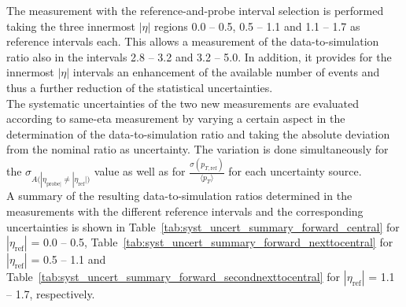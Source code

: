 The measurement with the reference-and-probe interval selection is performed taking the three innermost $|\eta|$ regions 0.0 -- 0.5, 0.5 -- 1.1 and 1.1 -- 1.7 as reference intervals each. This allows a measurement of the data-to-simulation ratio also in the intervals 2.8 -- 3.2 and 3.2 -- 5.0. In addition, it provides for the innermost $|\eta|$ intervals an enhancement of the available number of events and thus a further reduction of the statistical uncertainties.\\
The systematic uncertainties of the two new measurements are evaluated according to same-eta measurement by varying a certain aspect in the determination of the data-to-simulation ratio and taking the absolute deviation from the nominal ratio as uncertainty. The variation is done simultaneously for the $\sigma_{A({|\eta_{\mathrm{probe}|} \neq |\eta_{\mathrm{ref}}|)}}$ value as well as for $\frac{\sigma (p_{T, \mathrm{ref}})}{{\langle p_{T} \rangle}}$ for each uncertainty source.\\
A summary of the resulting data-to-simulation ratios determined in the measurements with the different reference intervals and the corresponding uncertainties is shown in Table~\ref{tab:syst_uncert_summary_forward_central} for $|\eta_\mathrm{ref}|$ = 0.0 -- 0.5, Table~\ref{tab:syst_uncert_summary_forward_nexttocentral} for $|\eta_\mathrm{ref}|$ = 0.5 -- 1.1 and Table~\ref{tab:syst_uncert_summary_forward_secondnexttocentral} for $|\eta_\mathrm{ref}|$ = 1.1 -- 1.7, respectively.

